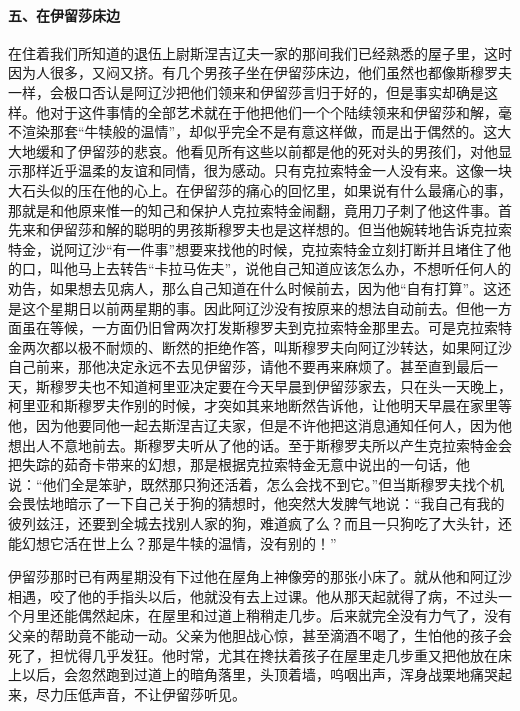 \paragraph*{五、在伊留莎床边}
\par 在住着我们所知道的退伍上尉斯涅吉辽夫一家的那间我们已经熟悉的屋子里，这时因为人很多，又闷又挤。有几个男孩子坐在伊留莎床边，他们虽然也都像斯穆罗夫一样，会极口否认是阿辽沙把他们领来和伊留莎言归于好的，但是事实却确是这样。他对于这件事情的全部艺术就在于他把他们一个个陆续领来和伊留莎和解，毫不渲染那套“牛犊般的温情”，却似乎完全不是有意这样做，而是出于偶然的。这大大地缓和了伊留莎的悲哀。他看见所有这些以前都是他的死对头的男孩们，对他显示那样近乎温柔的友谊和同情，很为感动。只有克拉索特金一人没有来。这像一块大石头似的压在他的心上。在伊留莎的痛心的回忆里，如果说有什么最痛心的事，那就是和他原来惟一的知己和保护人克拉索特金闹翻，竟用刀子刺了他这件事。首先来和伊留莎和解的聪明的男孩斯穆罗夫也是这样想的。但当他婉转地告诉克拉索特金，说阿辽沙“有一件事”想要来找他的时候，克拉索特金立刻打断并且堵住了他的口，叫他马上去转告“卡拉马佐夫”，说他自己知道应该怎么办，不想听任何人的劝告，如果想去见病人，那么自己知道在什么时候前去，因为他“自有打算”。这还是这个星期日以前两星期的事。因此阿辽沙没有按原来的想法自动前去。但他一方面虽在等候，一方面仍旧曾两次打发斯穆罗夫到克拉索特金那里去。可是克拉索特金两次都以极不耐烦的、断然的拒绝作答，叫斯穆罗夫向阿辽沙转达，如果阿辽沙自己前来，那他决定永远不去见伊留莎，请他不要再来麻烦了。甚至直到最后一天，斯穆罗夫也不知道柯里亚决定要在今天早晨到伊留莎家去，只在头一天晚上，柯里亚和斯穆罗夫作别的时候，才突如其来地断然告诉他，让他明天早晨在家里等他，因为他要同他一起去斯涅吉辽夫家，但是不许他把这消息通知任何人，因为他想出人不意地前去。斯穆罗夫听从了他的话。至于斯穆罗夫所以产生克拉索特金会把失踪的茹奇卡带来的幻想，那是根据克拉索特金无意中说出的一句话，他说：“他们全是笨驴，既然那只狗还活着，怎么会找不到它。”但当斯穆罗夫找个机会畏怯地暗示了一下自己关于狗的猜想时，他突然大发脾气地说：“我自己有我的彼列兹汪，还要到全城去找别人家的狗，难道疯了么？而且一只狗吃了大头针，还能幻想它活在世上么？那是牛犊的温情，没有别的！”
\par 伊留莎那时已有两星期没有下过他在屋角上神像旁的那张小床了。就从他和阿辽沙相遇，咬了他的手指头以后，他就没有去上过课。他从那天起就得了病，不过头一个月里还能偶然起床，在屋里和过道上稍稍走几步。后来就完全没有力气了，没有父亲的帮助竟不能动一动。父亲为他胆战心惊，甚至滴酒不喝了，生怕他的孩子会死了，担忧得几乎发狂。他时常，尤其在搀扶着孩子在屋里走几步重又把他放在床上以后，会忽然跑到过道上的暗角落里，头顶着墙，呜咽出声，浑身战栗地痛哭起来，尽力压低声音，不让伊留莎听见。
